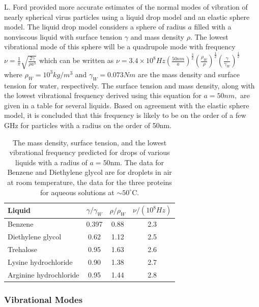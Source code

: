 \documentclass[11pt]{report}
\begin{document}
				\noindent L. Ford provided \cite{estimates} more accurate estimates of the normal modes of vibration of nearly spherical virus particles using a liquid drop model and an elastic sphere model. The liquid drop model considers a sphere of radius $a$ filled with a nonviscous liquid with surface tension $\gamma$ and mass density $\rho$. The lowest vibrational mode of this sphere will be a quadrupole mode with frequency $\nu=\frac{1}{\pi} \sqrt{\frac{2 \gamma}{\rho a^{3}}}$ which can be written as $\nu=3.4 \times 10^{8} H z\left(\frac{50 n m}{a}\right)^{\frac{3}{2}}\left(\frac{\rho_{W}}{\rho}\right)^{\frac{1}{2}}\left(\frac{\gamma}{\gamma_{W}}\right)^{\frac{1}{2}}$ where $\rho_{W}=10^{3} k g / m^{3}$ and $\gamma_{W}=0.073 N m$ are the mass density and surface tension for water, respectively. The surface tension and mass density, along with the lowest vibrational frequency derived using this equation for $a=50 n m,$ are given in a table for several liquids. Based on agreement with the elastic sphere model, it is concluded that this frequency is likely to be on the order of a few GHz for particles with a radius on the order of 50nm.
			 
			
				\begin{table}
			 		\centering
					\begin{tabularx}{\textwidth}{|X||c|c|c|}
					\hline \hline Liquid & $\gamma / \gamma_{W}$ & $\rho / \rho_{W}$ & $\nu /\left(10^{8} H z\right)$ \\
					\hline Benzene & 0.397 & 0.88 & 2.3 \\
					Diethylene glycol & 0.62 & 1.12 & 2.5 \\
					Trehalose & 0.95 & 1.63 & 2.6 \\
					Lysine hydrochloride & 0.90 & 1.38 & 2.7 \\
					Arginine hydrochloride & 0.95 & 1.44 & 2.8 \\
					\hline \hline
					\end{tabularx}
					\caption{The mass density, surface tension, and the lowest vibrational frequency predicted for drops of various liquids with a radius of $a=50 \mathrm{nm}$. The data for Benzene and Diethylene glycol are for droplets in air at room temperature, the data for the three proteins for aqueous solutions at $\sim 50^{\circ} \mathrm{C}$.}
				\end{table}
				
			\subsubsection{Vibrational Modes}
\end{document}

